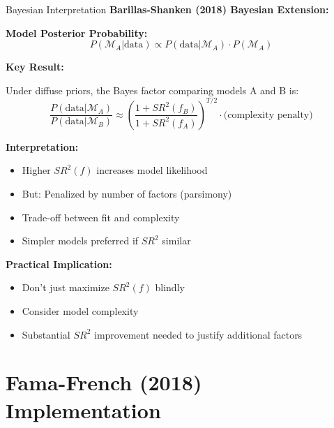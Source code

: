 \documentclass{beamer}
\begin{document}
\begin{frame}[allowframebreaks]{Bayesian Interpretation}
    \textbf{Barillas-Shanken (2018) Bayesian Extension:}

    \textbf{Model Posterior Probability:}
    \begin{equation}\label{eq:bayesian}
        P(\mathcal{M}_A | \text{data}) \propto P(\text{data} | \mathcal{M}_A) \cdot P(\mathcal{M}_A)
    \end{equation}
    
    \textbf{Key Result:}
    
    Under diffuse priors, the Bayes factor comparing models A and B is:
    \begin{equation*}
        \frac{P(\text{data} | \mathcal{M}_A)}{P(\text{data} | \mathcal{M}_B)} \approx \left(\frac{1 + SR^2(f_B)}{1 + SR^2(f_A)}\right)^{T/2} \cdot \text{(complexity penalty)}
    \end{equation*}
    
    \vspace{0.3cm}
    \textbf{Interpretation:}
    \begin{itemize}
        \item Higher $SR^2(f)$ increases model likelihood
        \item But: Penalized by number of factors (parsimony)
        \item Trade-off between fit and complexity
        \item Simpler models preferred if $SR^2$ similar
    \end{itemize}
    
    \textbf{Practical Implication:}
    \begin{itemize}
        \item Don't just maximize $SR^2(f)$ blindly
        \item Consider model complexity
        \item Substantial $SR^2$ improvement needed to justify additional factors
    \end{itemize}
\end{frame}

\section{Fama-French (2018) Implementation}
\end{document}
